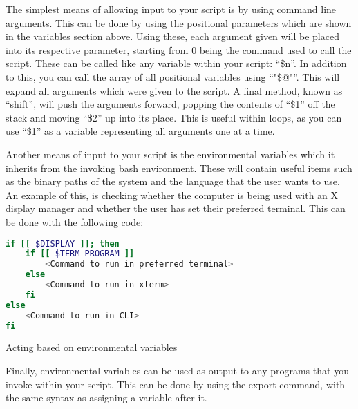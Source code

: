 			The simplest means of allowing input to your script is by using command line arguments.
			This can be done by using the positional parameters which are shown in the variables section above.
			Using these, each argument given will be placed into its respective parameter, starting from 0 being the command used to call the script.
			These can be called like any variable within your script: ``\$n''.
			In addition to this, you can call the array of all positional variables using ``"\$@"''.
			This will expand all arguments which were given to the script.
			A final method, known as ``shift'', will push the arguments forward, popping the contents of ``\$1'' off the stack and moving ``\$2'' up into its place.
			This is useful within loops, as you can use ``\$1'' as a variable representing all arguments one at a time.

			Another means of input to your script is the environmental variables which it inherits from the invoking bash environment.
			These will contain useful items such as the binary paths of the system and the language that the user wants to use.
			An example of this, is checking whether the computer is being used with an X display manager and whether the user has set their preferred terminal.
			This can be done with the following code:
			\begin{code}
			\begin{lstlisting}[language=bash]
if [[ $DISPLAY ]]; then
	if [[ $TERM_PROGRAM ]]
		<Command to run in preferred terminal>
	else
		<Command to run in xterm>
	fi
else
	<Command to run in CLI>
fi
			\end{lstlisting}
			\label{code:checkingEnvironmentalVariables}
			\caption{Acting based on environmental variables}
			\end{code}
			Finally, environmental variables can be used as output to any programs that you invoke within your script.
			This can be done by using the export command, with the same syntax as assigning a variable after it.

